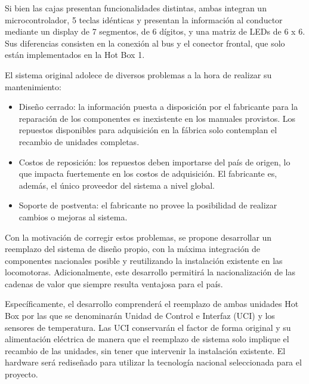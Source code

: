\documentclass[
11pt, %
codirector, %
]{charter}
\begin{document}
Si bien las cajas presentan funcionalidades distintas, ambas integran un microcontrolador, 5 teclas idénticas y presentan la información al conductor mediante un display de 7 segmentos, de 6 dígitos, y una matriz de LEDs de 6 x 6.
Sus diferencias consisten en la conexión al bus y el conector frontal, que solo están implementados en la Hot Box 1.

El sistema original adolece de diversos problemas a la hora de realizar su mantenimiento:
\begin{itemize}
\item Diseño cerrado: la información puesta a disposición por el fabricante para la reparación de los componentes es inexistente en los manuales provistos. Los repuestos disponibles para adquisición en la fábrica solo contemplan el recambio de unidades completas.
\item Costos de reposición: los repuestos deben importarse del país de origen, lo que impacta fuertemente en los costos de adquisición. El fabricante es, además, el único proveedor del sistema a nivel global.
\item Soporte de postventa: el fabricante no provee la posibilidad de realizar cambios o mejoras al sistema. 
\end{itemize}

Con la motivación de corregir estos problemas, se propone desarrollar un reemplazo del sistema de diseño propio, con la máxima integración de componentes nacionales posible y reutilizando la instalación existente en las locomotoras. Adicionalmente, este desarrollo permitirá la nacionalización de las cadenas de valor que siempre resulta ventajosa para el país. 

Específicamente, el desarrollo comprenderá el reemplazo de ambas unidades Hot Box por las que se denominarán Unidad de Control e Interfaz (UCI) y los sensores de temperatura.
Las UCI conservarán el factor de forma original y su alimentación eléctrica de manera que el reemplazo de sistema solo implique el recambio de las unidades, sin tener que intervenir la instalación existente. El hardware será rediseñado para utilizar la tecnología nacional seleccionada para el proyecto.
\end{document}
